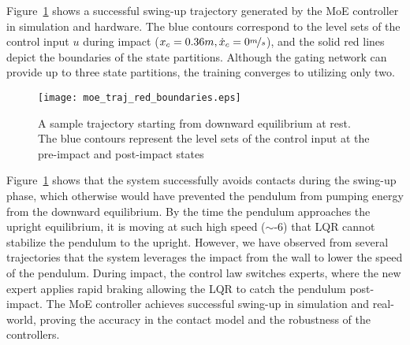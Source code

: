 Figure~\ref{fig:cartpole_trajectory} shows a successful swing-up trajectory
generated by the MoE controller in simulation and hardware.
%
The blue contours correspond to the level sets of the control input $u$ during
impact ($x_c=0.36m, \dot{x}_c = 0\nicefrac{m}{s}$), and the solid red lines
depict the boundaries of the state partitions.
%
Although the gating network can provide up to three state partitions,
the training converges to utilizing only two.
%
\begin{figure}[tb]
    \centering
    \texttt{[image: moe\_traj\_red\_boundaries.eps]}
    \caption{A sample trajectory starting from
    downward equilibrium at rest. The blue contours represent the level sets of
    the control input at the pre-impact and post-impact states}
    \label{fig:cartpole_trajectory}
\end{figure}
%
\noindent Figure~\ref{fig:cartpole_trajectory} shows that the system successfully avoids
contacts during the swing-up phase, which otherwise would have prevented the
pendulum from pumping energy from the downward equilibrium.
%
By the time the pendulum approaches the upright equilibrium, it is moving at
such high speed ($\sim$-6) that LQR cannot stabilize the
pendulum to the upright.
%
However, we have observed from several trajectories that the system leverages
the impact from the wall to lower the speed of the pendulum.
%
During impact, the control law switches experts, where the new expert applies
rapid braking allowing the LQR to catch the pendulum post-impact.
%
The MoE controller achieves successful swing-up in simulation and real-world,
proving the accuracy in the contact model and the robustness of the
controllers.


